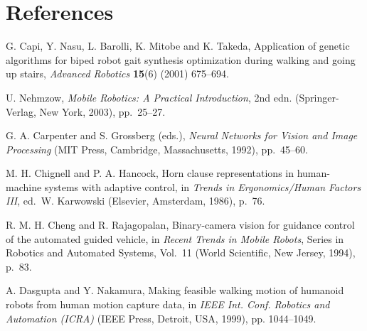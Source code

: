 \documentclass{ws-ijhr}
\begin{document}
\section*{References}


\vspace*{-5pt}   %


\myitem G. Capi, Y. Nasu, L. Barolli, K. Mitobe and K. Takeda,  
Application of genetic algorithms for biped robot gait synthesis 
optimization during walking and going up stairs, 
{\it Advanced Robotics} {\bf 15}(6) (2001) 675--694.


\myitem U. Nehmzow, {\it Mobile Robotics: A Practical 
Introduction}, 2nd edn. (Springer-Verlag, New York, 2003), pp.~25--27.
  

\myitem G. A. Carpenter and S. Grossberg (eds.),  
{\it Neural Networks for Vision and Image Processing} 
(MIT Press, Cambridge, Massachusetts, 1992), pp.~45--60.  


\myitem M. H. Chignell and P. A. Hancock, Horn clause 
representations in human-machine systems with adaptive control, 
in {\it Trends in Ergonomics/Human Factors III}, 
ed.~W. Karwowski (Elsevier, Amsterdam, 1986), p.~76.  


\myitem R. M. H. Cheng and R. Rajagopalan, Binary-camera vision  
for guidance control of the automated guided vehicle, in 
{\it Recent Trends in Mobile Robots}, 
Series in Robotics and Automated Systems, Vol.~11 
(World Scientific, New Jersey, 1994), p.~83.


\myitem A. Dasgupta and Y. Nakamura, Making feasible walking 
motion of humanoid robots from human motion capture data, in 
{\it IEEE Int. Conf. Robotics and Automation (ICRA)} 
(IEEE Press, Detroit, USA, 1999), pp. 1044--1049.
\eject


\vfill\eject
\end{document}
